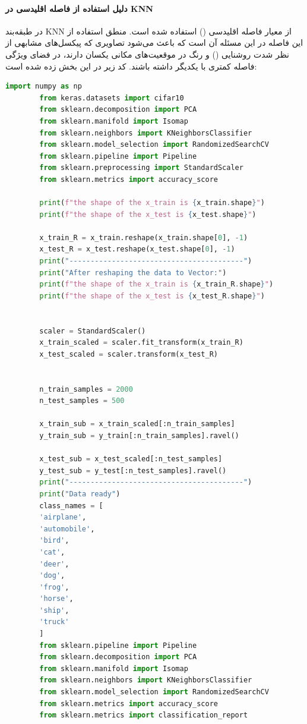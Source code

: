 \documentclass{article}
\begin{document}
\paragraph{دلیل استفاده از فاصله اقلیدسی در KNN}
در طبقه‌بند KNN از معیار فاصله اقلیدسی () استفاده شده است. منطق استفاده از این فاصله در این مسئله آن است که باعث می‌شود تصاویری که پیکسل‌های مشابهی از نظر شدت روشنایی () و رنگ در موقعیت‌های مکانی یکسان دارند، در فضای ویژگی فاصله کمتری با یکدیگر داشته باشند.
کد زیر در این بخش زده شده است:
\begin{latin}
	\begin{lstlisting}[language=Python]
		import numpy as np
		from keras.datasets import cifar10
		from sklearn.decomposition import PCA
		from sklearn.manifold import Isomap
		from sklearn.neighbors import KNeighborsClassifier
		from sklearn.model_selection import RandomizedSearchCV
		from sklearn.pipeline import Pipeline
		from sklearn.preprocessing import StandardScaler
		from sklearn.metrics import accuracy_score
		
		print(f"the shape of the x_train is {x_train.shape}")
		print(f"the shape of the x_test is {x_test.shape}")
		
		x_train_R = x_train.reshape(x_train.shape[0], -1)
		x_test_R = x_test.reshape(x_test.shape[0], -1)
		print("-----------------------------------------")
		print("After reshaping the data to Vector:")
		print(f"the shape of the x_train is {x_train_R.shape}")
		print(f"the shape of the x_test is {x_test_R.shape}")
		
		
		scaler = StandardScaler()
		x_train_scaled = scaler.fit_transform(x_train_R)
		x_test_scaled = scaler.transform(x_test_R)
		
		
		n_train_samples = 2000
		n_test_samples = 500
		
		x_train_sub = x_train_scaled[:n_train_samples]
		y_train_sub = y_train[:n_train_samples].ravel()
		
		x_test_sub = x_test_scaled[:n_test_samples]
		y_test_sub = y_test[:n_test_samples].ravel()
		print("-----------------------------------------")
		print("Data ready")
		class_names = [
		'airplane',
		'automobile',
		'bird',
		'cat',
		'deer',
		'dog',
		'frog',
		'horse',
		'ship',
		'truck'
		]
		from sklearn.pipeline import Pipeline
		from sklearn.decomposition import PCA
		from sklearn.manifold import Isomap
		from sklearn.neighbors import KNeighborsClassifier
		from sklearn.model_selection import RandomizedSearchCV
		from sklearn.metrics import accuracy_score
		from sklearn.metrics import classification_report
		

\end{lstlisting}
\end{latin}
\end{document}
